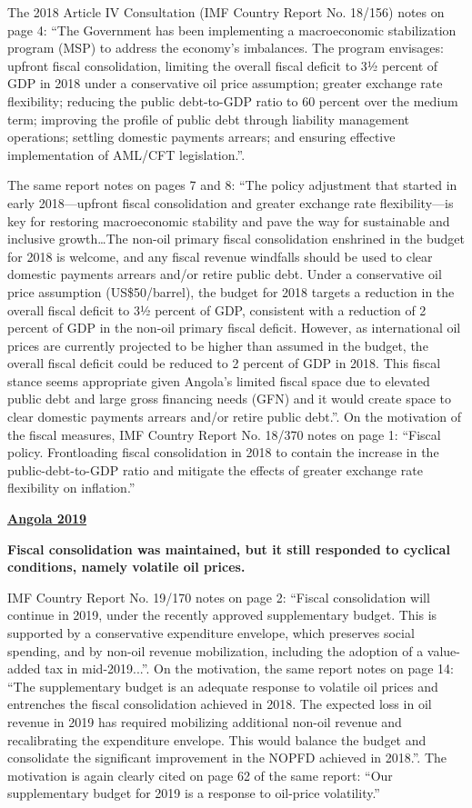 The 2018 Article IV Consultation (IMF Country Report No. 18/156) notes on page 4: “The Government has been implementing a macroeconomic stabilization program (MSP) to address the economy’s imbalances. The program envisages: upfront fiscal consolidation, limiting the overall fiscal deficit to 3½ percent of GDP in 2018 under a conservative oil price assumption; greater exchange rate flexibility; reducing the public debt-to-GDP ratio to 60 percent over the medium term; improving the profile of public debt through liability management operations; settling domestic payments arrears; and ensuring effective implementation of AML/CFT legislation.”. 

The same report notes on pages 7 and 8: “The policy adjustment that started in early 2018—upfront fiscal consolidation and greater exchange rate flexibility—is key for restoring macroeconomic stability and pave the way for sustainable and inclusive growth…The non-oil primary fiscal consolidation enshrined in the budget for 2018 is welcome, and any fiscal revenue windfalls should be used to clear domestic payments arrears and/or retire public debt. Under a conservative oil price assumption (US\$50/barrel), the budget for 2018 targets a reduction in the overall fiscal deficit to 3½ percent of GDP, consistent with a reduction of 2 percent of GDP in the non-oil primary fiscal deficit. However, as international oil prices are currently projected to be higher than assumed in the budget, the overall fiscal deficit could be reduced to 2 percent of GDP in 2018. This fiscal stance seems appropriate given Angola’s limited fiscal space due to elevated public debt and large gross financing needs (GFN) and it would create space to clear domestic payments arrears and/or retire public debt.”. On the motivation of the fiscal measures, IMF Country Report No. 18/370 notes on page 1: “Fiscal policy. Frontloading fiscal consolidation in 2018 to contain the increase in the public-debt-to-GDP ratio and mitigate the effects of greater exchange rate flexibility on inflation.”

\textbf{\underline{Angola 2019}}

\textbf{Fiscal consolidation was maintained, but it still responded to cyclical conditions, namely volatile oil prices.}

IMF Country Report No. 19/170 notes on page 2: “Fiscal consolidation will continue in 2019, under the recently approved supplementary budget. This is supported by a conservative expenditure envelope, which preserves social spending, and by non-oil revenue mobilization, including the adoption of a value-added tax in mid-2019...”. On the motivation, the same report notes on page 14: “The supplementary budget is an adequate response to volatile oil prices and entrenches the fiscal consolidation achieved in 2018. The expected loss in oil revenue in 2019 has required mobilizing additional non-oil revenue and recalibrating the expenditure envelope. This would balance the budget and consolidate the significant improvement in the NOPFD achieved in 2018.”. The motivation is again clearly cited on page 62 of the same report: “Our supplementary budget for 2019 is a response to oil-price volatility.”

